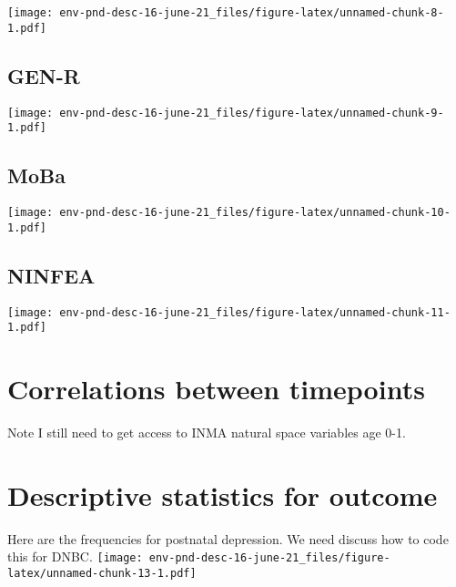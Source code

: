\documentclass[]{article}
\begin{document}
\texttt{[image: env-pnd-desc-16-june-21\_files/figure-latex/unnamed-chunk-8-1.pdf]}

\newpage

\hypertarget{gen-r}{%
\subsection{GEN-R}\label{gen-r}}

\texttt{[image: env-pnd-desc-16-june-21\_files/figure-latex/unnamed-chunk-9-1.pdf]}

\newpage

\hypertarget{moba}{%
\subsection{MoBa}\label{moba}}

\texttt{[image: env-pnd-desc-16-june-21\_files/figure-latex/unnamed-chunk-10-1.pdf]}

\newpage

\hypertarget{ninfea}{%
\subsection{NINFEA}\label{ninfea}}

\texttt{[image: env-pnd-desc-16-june-21\_files/figure-latex/unnamed-chunk-11-1.pdf]}

\newpage

\hypertarget{correlations-between-timepoints}{%
\section{Correlations between timepoints}\label{correlations-between-timepoints}}

Note I still need to get access to INMA natural space variables age 0-1.

\hypertarget{descriptive-statistics-for-outcome}{%
\section{Descriptive statistics for outcome}\label{descriptive-statistics-for-outcome}}

Here are the frequencies for postnatal depression. We need discuss how to code
this for DNBC.
\texttt{[image: env-pnd-desc-16-june-21\_files/figure-latex/unnamed-chunk-13-1.pdf]}

\newpage
\end{document}
